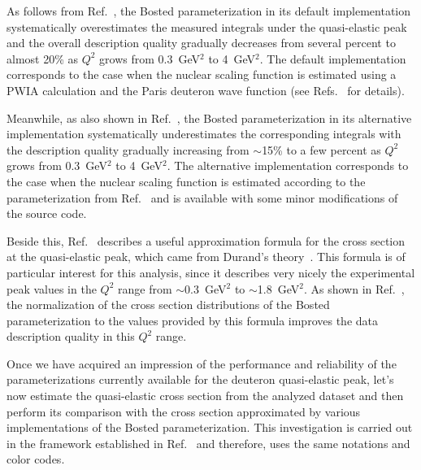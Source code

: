 As follows from Ref.~\cite{note_QE_peak}, the Bosted parameterization in its default implementation systematically overestimates the measured integrals under the quasi-elastic peak and the overall description quality gradually decreases from several percent to almost 20\% as $Q^2$ grows from 0.3~GeV$^2$ to 4~GeV$^2$. The default implementation corresponds to the case when the nuclear scaling function is estimated using a PWIA calculation and the Paris deuteron wave function (see Refs.~\cite{Bosted_fit,Bosted:2007xd} for details). 

Meanwhile, as also shown in Ref.~\cite{note_QE_peak}, the Bosted parameterization in its alternative implementation systematically underestimates the corresponding integrals with the description quality gradually increasing from $\sim$15\% to a few percent as $Q^2$ grows from 0.3~GeV$^2$ to 4~GeV$^2$. The alternative implementation corresponds to the case when the nuclear scaling function is estimated according to the parameterization from Ref.~\cite{Bodek:2014pka} and is available with some minor modifications of the source code. 


Beside this, Ref.~\cite{note_QE_peak} describes a useful approximation formula for the cross section at the quasi-elastic peak, which came from Durand's theory~\cite{Durand:1961zz}. This formula is of particular interest for this analysis, since it describes very nicely the experimental peak values in the $Q^{2}$ range from $\sim$0.3~GeV$^2$ to $\sim$1.8~GeV$^2$. As shown in Ref.~\cite{note_QE_peak}, the normalization of the cross section distributions of the Bosted parameterization to the values provided by this formula improves the data description quality in this $Q^{2}$ range.



Once we have acquired an impression of the performance and reliability of the parameterizations currently available for the deuteron quasi-elastic peak, let's now estimate the quasi-elastic cross section from the analyzed dataset and then perform its comparison with the cross section approximated by various implementations of the Bosted parameterization. This investigation is carried out in the framework established in Ref.~\cite{note_QE_peak} and therefore, uses the same notations and color codes.


